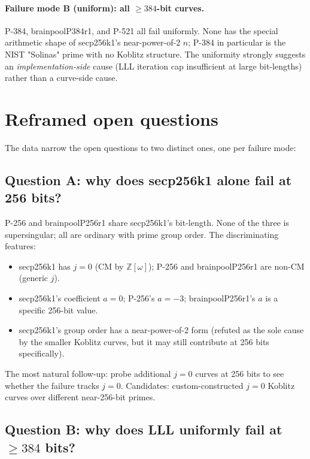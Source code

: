 \documentclass[10pt,a4paper]{article}
\newcommand{\ZZ}{\mathbb{Z}}
\begin{document}
\paragraph{Failure mode B (uniform): all $\geq 384$-bit curves.}
P-384, brainpoolP384r1, and P-521 all fail uniformly. None has
the special arithmetic shape of secp256k1's near-power-of-2 $n$;
P-384 in particular is the NIST "Solinas" prime with no Koblitz
structure. The uniformity strongly suggests an
\emph{implementation-side} cause (LLL iteration cap insufficient
at large bit-lengths) rather than a curve-side cause.

\section{Reframed open questions}

The data narrow the open questions to two distinct ones, one per
failure mode:

\subsection{Question A: why does secp256k1 alone fail at 256 bits?}

P-256 and brainpoolP256r1 share secp256k1's bit-length. None of
the three is supersingular; all are ordinary with prime group
order. The discriminating features:

\begin{itemize}
\item secp256k1 has $j = 0$ (CM by $\ZZ[\omega]$); P-256 and
      brainpoolP256r1 are non-CM (generic $j$).
\item secp256k1's coefficient $a = 0$; P-256's $a = -3$;
      brainpoolP256r1's $a$ is a specific 256-bit value.
\item secp256k1's group order has a near-power-of-2 form (refuted
      as the sole cause by the smaller Koblitz curves, but it may
      still contribute at 256 bits specifically).
\end{itemize}

The most natural follow-up: probe additional $j = 0$ curves at
256 bits to see whether the failure tracks $j = 0$. Candidates:
custom-constructed $j = 0$ Koblitz curves over different
near-256-bit primes.

\subsection{Question B: why does LLL uniformly fail at $\geq 384$ bits?}
\end{document}
